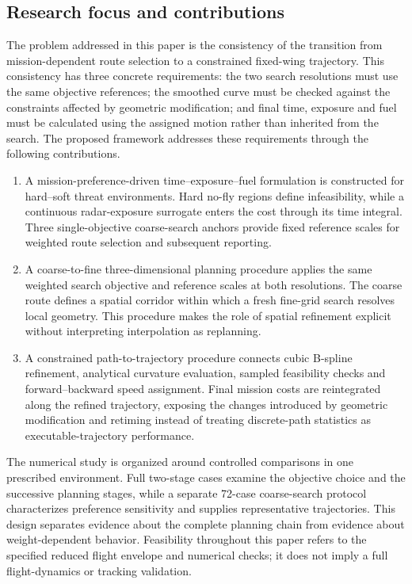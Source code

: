 \documentclass[preprint,12pt]{elsarticle}
\begin{document}
\subsection{Research focus and contributions}
\label{sec:contributions}

The problem addressed in this paper is the consistency of the transition
from mission-dependent route selection to a constrained fixed-wing
trajectory. This consistency has three concrete requirements: the two
search resolutions must use the same objective references; the smoothed
curve must be checked against the constraints affected by geometric
modification; and final time, exposure and fuel must be calculated using
the assigned motion rather than inherited from the search. The proposed
framework addresses these requirements through the following contributions.

\begin{enumerate}
\item A mission-preference-driven time--exposure--fuel formulation is
constructed for hard--soft threat environments. Hard no-fly regions define
infeasibility, while a continuous radar-exposure surrogate enters the cost
through its time integral. Three single-objective coarse-search anchors
provide fixed reference scales for weighted route selection and subsequent
reporting.

\item A coarse-to-fine three-dimensional planning procedure applies the
same weighted search objective and reference scales at both resolutions.
The coarse route defines a spatial corridor within which a fresh fine-grid
search resolves local geometry. This procedure makes the role of spatial
refinement explicit without interpreting interpolation as replanning.

\item A constrained path-to-trajectory procedure connects cubic B-spline
refinement, analytical curvature evaluation, sampled feasibility checks
and forward--backward speed assignment. Final mission costs are
reintegrated along the refined trajectory, exposing the changes introduced
by geometric modification and retiming instead of treating discrete-path
statistics as executable-trajectory performance.
\end{enumerate}

The numerical study is organized around controlled comparisons in one
prescribed environment. Full two-stage cases examine the objective choice
and the successive planning stages, while a separate 72-case coarse-search
protocol characterizes preference sensitivity and supplies representative
trajectories. This design separates evidence about the complete planning
chain from evidence about weight-dependent behavior. Feasibility throughout
this paper refers to the specified reduced flight envelope and numerical
checks; it does not imply a full flight-dynamics or tracking validation.
\end{document}
